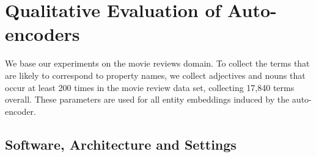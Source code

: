 








\section{Qualitative Evaluation of Auto-encoders}\label{auto-encoder-qual}

We base our experiments on the movie reviews domain. To collect the terms that are likely to correspond to property names, we collect adjectives and nouns that occur at least 200 times in the movie review data set, collecting 17,840 terms overall.  These parameters are used for all entity embeddings induced by the auto-encoder. 

\subsection{Software, Architecture and Settings}

